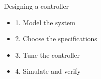 \begin{frame}{Designing a controller}
\begin{itemize}
  \item 1. Model the system
  \item<2-> 2. Choose the specifications
  \item<3-> 3. Tune the controller
  \item<4-> 4. Simulate and verify
\end{itemize}
\end{frame}
